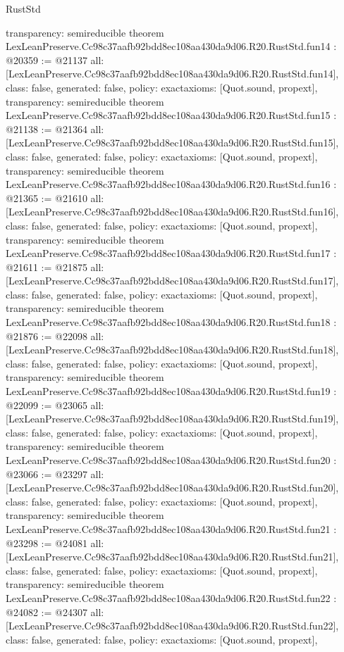 \begin{lexlean}{RustStd}
\begin{coremodule}
{  transparency: semireducible
}
theorem LexLeanPreserve.Cc98c37aafb92bdd8ec108aa430da9d06.R20.RustStd.fun14 : @20359 := @21137 {
  all: [LexLeanPreserve.Cc98c37aafb92bdd8ec108aa430da9d06.R20.RustStd.fun14],
  class: false,
  generated: false,
  policy: exact{axioms: [Quot.sound, propext]},
  transparency: semireducible
}
theorem LexLeanPreserve.Cc98c37aafb92bdd8ec108aa430da9d06.R20.RustStd.fun15 : @21138 := @21364 {
  all: [LexLeanPreserve.Cc98c37aafb92bdd8ec108aa430da9d06.R20.RustStd.fun15],
  class: false,
  generated: false,
  policy: exact{axioms: [Quot.sound, propext]},
  transparency: semireducible
}
theorem LexLeanPreserve.Cc98c37aafb92bdd8ec108aa430da9d06.R20.RustStd.fun16 : @21365 := @21610 {
  all: [LexLeanPreserve.Cc98c37aafb92bdd8ec108aa430da9d06.R20.RustStd.fun16],
  class: false,
  generated: false,
  policy: exact{axioms: [Quot.sound, propext]},
  transparency: semireducible
}
theorem LexLeanPreserve.Cc98c37aafb92bdd8ec108aa430da9d06.R20.RustStd.fun17 : @21611 := @21875 {
  all: [LexLeanPreserve.Cc98c37aafb92bdd8ec108aa430da9d06.R20.RustStd.fun17],
  class: false,
  generated: false,
  policy: exact{axioms: [Quot.sound, propext]},
  transparency: semireducible
}
theorem LexLeanPreserve.Cc98c37aafb92bdd8ec108aa430da9d06.R20.RustStd.fun18 : @21876 := @22098 {
  all: [LexLeanPreserve.Cc98c37aafb92bdd8ec108aa430da9d06.R20.RustStd.fun18],
  class: false,
  generated: false,
  policy: exact{axioms: [Quot.sound, propext]},
  transparency: semireducible
}
theorem LexLeanPreserve.Cc98c37aafb92bdd8ec108aa430da9d06.R20.RustStd.fun19 : @22099 := @23065 {
  all: [LexLeanPreserve.Cc98c37aafb92bdd8ec108aa430da9d06.R20.RustStd.fun19],
  class: false,
  generated: false,
  policy: exact{axioms: [Quot.sound, propext]},
  transparency: semireducible
}
theorem LexLeanPreserve.Cc98c37aafb92bdd8ec108aa430da9d06.R20.RustStd.fun20 : @23066 := @23297 {
  all: [LexLeanPreserve.Cc98c37aafb92bdd8ec108aa430da9d06.R20.RustStd.fun20],
  class: false,
  generated: false,
  policy: exact{axioms: [Quot.sound, propext]},
  transparency: semireducible
}
theorem LexLeanPreserve.Cc98c37aafb92bdd8ec108aa430da9d06.R20.RustStd.fun21 : @23298 := @24081 {
  all: [LexLeanPreserve.Cc98c37aafb92bdd8ec108aa430da9d06.R20.RustStd.fun21],
  class: false,
  generated: false,
  policy: exact{axioms: [Quot.sound, propext]},
  transparency: semireducible
}
theorem LexLeanPreserve.Cc98c37aafb92bdd8ec108aa430da9d06.R20.RustStd.fun22 : @24082 := @24307 {
  all: [LexLeanPreserve.Cc98c37aafb92bdd8ec108aa430da9d06.R20.RustStd.fun22],
  class: false,
  generated: false,
  policy: exact{axioms: [Quot.sound, propext]},
}
\end{coremodule}
\end{lexlean}
